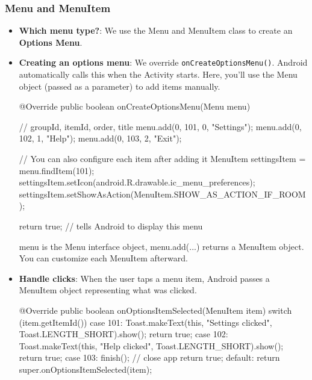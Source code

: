 \documentclass{report}
\begin{document}
    \subsubsection{Menu and MenuItem}
    \begin{itemize}
        \item \textbf{Which menu type?}: We use the Menu and MenuItem class to create an \textbf{Options Menu}.
        \item \textbf{Creating an options menu}: We override \texttt{onCreateOptionsMenu()}. Android automatically calls this when the Activity starts. Here, you’ll use the Menu object (passed as a parameter) to add items manually.
            \bigbreak \noindent 
            \begin{javacode}
                @Override
                public boolean onCreateOptionsMenu(Menu menu) {
                    // groupId, itemId, order, title
                    menu.add(0, 101, 0, "Settings");
                    menu.add(0, 102, 1, "Help");
                    menu.add(0, 103, 2, "Exit");

                    // You can also configure each item after adding it
                    MenuItem settingsItem = menu.findItem(101);
                    settingsItem.setIcon(android.R.drawable.ic_menu_preferences);
                    settingsItem.setShowAsAction(MenuItem.SHOW_AS_ACTION_IF_ROOM);

                    return true;  // tells Android to display this menu
                }
            \end{javacode}
            \bigbreak \noindent 
            menu is the Menu interface object, menu.add(...) returns a MenuItem object. You can customize each MenuItem afterward.
        \item \textbf{Handle clicks}: When the user taps a menu item, Android passes a MenuItem object representing what was clicked.
            \bigbreak \noindent 
            \begin{javacode}
                @Override
                public boolean onOptionsItemSelected(MenuItem item) {
                    switch (item.getItemId()) {
                        case 101:
                        Toast.makeText(this, "Settings clicked", Toast.LENGTH_SHORT).show();
                        return true;
                        case 102:
                        Toast.makeText(this, "Help clicked", Toast.LENGTH_SHORT).show();
                        return true;
                        case 103:
                        finish(); // close app
                        return true;
                        default:
                        return super.onOptionsItemSelected(item);
                    }
                }
            \end{javacode}



    \end{itemize}
\end{document}
